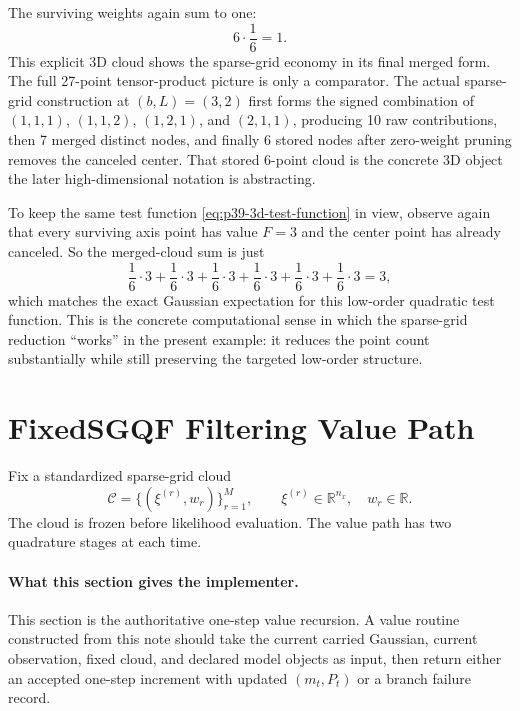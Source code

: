 \documentclass[11pt]{article}
\numberwithin{equation}{section}
\newcommand{\R}{\mathbb R}
\begin{document}
The surviving weights again sum to one:
\begin{equation}
  6\cdot \frac16 = 1.
  \label{eq:p38-3d-weight-total}
\end{equation}
This explicit 3D cloud shows the sparse-grid economy in its final merged form.
The full 27-point tensor-product picture is only a comparator.  The actual
sparse-grid construction at \((b,L)=(3,2)\) first forms the signed combination
of \((1,1,1)\), \((1,1,2)\), \((1,2,1)\), and \((2,1,1)\), producing 10 raw
contributions, then 7 merged distinct nodes, and finally 6 stored nodes after
zero-weight pruning removes the canceled center.  That stored 6-point cloud is
the concrete 3D object the later high-dimensional notation is abstracting.

To keep the same test function \eqref{eq:p39-3d-test-function} in view, observe
again that every surviving axis point has value \(F=3\) and the center point has
already canceled.  So the merged-cloud sum is just
\begin{equation}
  \frac16\cdot 3 + \frac16\cdot 3 + \frac16\cdot 3 + \frac16\cdot 3 +
  \frac16\cdot 3 + \frac16\cdot 3 = 3,
  \label{eq:p39-3d-toy-cloud-sum}
\end{equation}
which matches the exact Gaussian expectation for this low-order quadratic test
function.  This is the concrete computational sense in which the sparse-grid
reduction ``works'' in the present example: it reduces the point count
substantially while still preserving the targeted low-order structure.

\section{FixedSGQF Filtering Value Path}
\label{sec:p31-value-path}

Fix a standardized sparse-grid cloud
\begin{equation}
  \mathcal C=\{(\xi^{(r)},w_r)\}_{r=1}^M,
  \qquad
  \xi^{(r)}\in\R^{n_x},
  \quad
  w_r\in\R.
  \label{eq:p31-cloud-for-filter}
\end{equation}
The cloud is frozen before likelihood evaluation.  The value path has two
quadrature stages at each time.

\paragraph{What this section gives the implementer.}
This section is the authoritative one-step value recursion.  A value routine
constructed from this note should take the current carried Gaussian,
current observation, fixed cloud, and declared model objects as input, then
return either an accepted one-step increment with updated \((m_t,P_t)\) or a
branch failure record.
\end{document}
